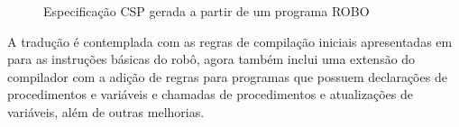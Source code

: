 \begin{figure}[h]
\centering
\caption{Especificação CSP gerada a partir de um programa ROBO}

\label{fig:progcsp}
\end{figure}

A tradução é contemplada com as regras de compilação iniciais apresentadas em \cite{nogueira} para as instruções básicas do robô, agora também inclui uma extensão do compilador com a adição de regras para programas que possuem declarações de procedimentos e variáveis e chamadas de procedimentos e atualizações de variáveis, além de outras melhorias.

